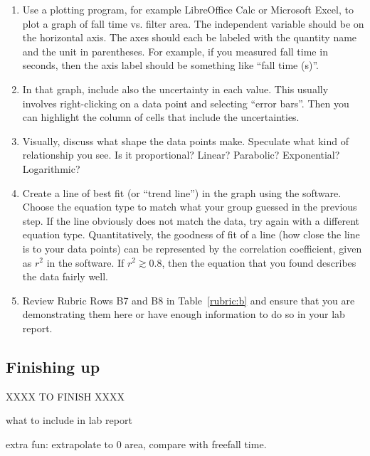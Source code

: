 \begin{enumerate}
	\item Use a plotting program, for example LibreOffice Calc or Microsoft Excel, to plot a graph of fall time vs. filter area. The independent variable should be on the horizontal axis. The axes should each be labeled with the quantity name and the unit in parentheses. For example, if you measured fall time in seconds, then the axis label should be something like ``fall time (s)''.
	
	\item In that graph, include also the uncertainty in each value. This usually involves right-clicking on a data point and selecting ``error bars''. Then you can highlight the column of cells that include the uncertainties.
	
	\item Visually, discuss what shape the data points make. Speculate what kind of relationship you see. Is it proportional? Linear? Parabolic? Exponential? Logarithmic?
	
	\item Create a line of best fit (or ``trend line'') in the graph using the software. Choose the equation type to match what your group guessed in the previous step. If the line obviously does not match the data, try again with a different equation type. Quantitatively, the goodness of fit of a line (how close the line is to your data points) can be represented by the correlation coefficient, given as $r^2$ in the software. If $r^2 \gtrsim 0.8$, then the equation that you found describes the data fairly well.
	
	\item Review Rubric Rows B7 and B8 in Table~\ref{rubric:b} and ensure that you are demonstrating them here or have enough information to do so in your lab report.
\end{enumerate}

\subsection{Finishing up}

XXXX TO FINISH XXXX

what to include in lab report

extra fun: extrapolate to 0 area, compare with freefall time.

 
